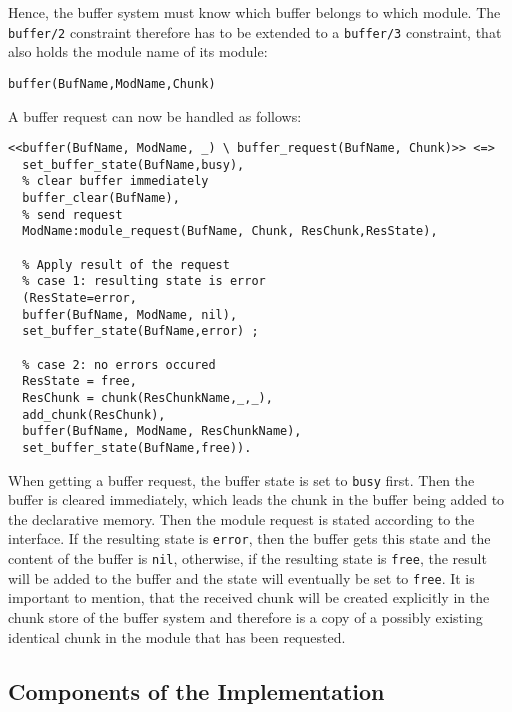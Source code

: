 Hence, the buffer system must know which buffer belongs to which module. The \lstinline|buffer/2| constraint therefore has to be extended to a \lstinline|buffer/3| constraint, that also holds the module name of its module:

\begin{lstlisting}
buffer(BufName,ModName,Chunk)
\end{lstlisting}

A buffer request can now be handled as follows:

\begin{lstlisting}[caption={Retrieval Request in CHR}, label=lst:retrieval_request_symbolic]
<<buffer(BufName, ModName, _) \ buffer_request(BufName, Chunk)>> <=>
  set_buffer_state(BufName,busy),
  % clear buffer immediately
  buffer_clear(BufName), 
  % send request
  ModName:module_request(BufName, Chunk, ResChunk,ResState),
  
  % Apply result of the request
  % case 1: resulting state is error
  (ResState=error, 
  buffer(BufName, ModName, nil),
  set_buffer_state(BufName,error) ;
  
  % case 2: no errors occured
  ResState = free,
  ResChunk = chunk(ResChunkName,_,_),
  add_chunk(ResChunk), 
  buffer(BufName, ModName, ResChunkName),
  set_buffer_state(BufName,free)).
\end{lstlisting}

When getting a buffer request, the buffer state is set to \lstinline|busy| first. Then the buffer is cleared immediately, which leads the chunk in the buffer being added to the declarative memory. Then the module request is stated according to the interface. If the resulting state is \lstinline|error|, then the buffer gets this state and the content of the buffer is \lstinline|nil|, otherwise, if the resulting state is \lstinline|free|, the result will be added to the buffer and the state will eventually be set to \lstinline|free|.  It is important to mention, that the received chunk will be created explicitly in the chunk store of the buffer system and therefore is a copy of a possibly existing identical chunk in the module that has been requested.

\subsection{Components of the Implementation}
\label{implementation:components}

